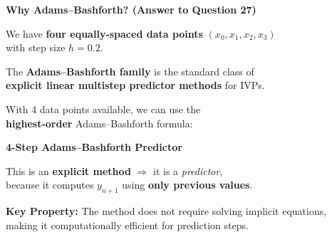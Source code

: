 \documentclass[12pt]{beamer}
\begin{document}
\begin{frame}{\textbf{Why Adams--Bashforth? (Answer to Question 27)}}
  \begin{center}
    \vfill
    We have \textbf{four equally-spaced data points} $(x_0, x_1, x_2, x_3)$\\[0.3em]
    with step size $h = 0.2$.

    \vspace{1.5em}
    The \textbf{Adams--Bashforth family} is the standard class of\\
    \textbf{explicit linear multistep predictor methods} for IVPs.

    \vspace{1.5em}
    With 4 data points available, we can use the\\
    \textbf{highest-order} Adams--Bashforth formula:

    \vspace{1em}
    \Large\textbf{\textcolor{madblue}{4-Step Adams--Bashforth Predictor}}

    \vspace{1em}
    \normalsize
    This is an \textbf{explicit method} $\Rightarrow$ it is a \textit{predictor},\\[0.3em]
    because it computes $y_{n+1}$ using \textbf{only previous values}.

    \vspace{0.5em}
    \textbf{Key Property:} The method does not require solving implicit equations,\\[0.2em]
    making it computationally efficient for prediction steps.
    \vfill
  \end{center}
\end{frame}
\end{document}

